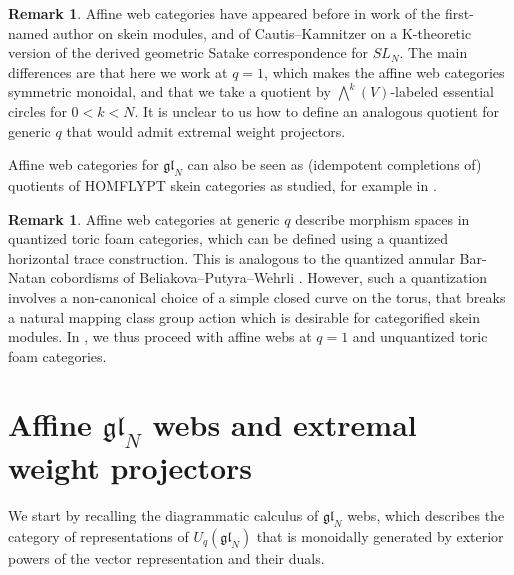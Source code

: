 \documentclass[11pt]{article}
\theoremstyle{definition}
\newtheorem{rema}[theo]{Remark}
\numberwithin{equation}{section}
\newcommand{\glnn}[1]{\mf{gl}_{#1}}
\def\mf{\mathfrak}
\newcommand{\bVn}{\bigwedge}
\begin{document}
\begin{rema} Affine web categories have appeared before in work of the
first-named author \cite{Queff_aff} on skein modules, and of Cautis--Kamnitzer
\cite{CK_ann} on a K-theoretic version of the derived geometric Satake
correspondence for $SL_N$. The main differences are that here we work at $q=1$,
which makes the affine web categories symmetric monoidal, and that we take a
quotient by $\bVn^k(V)$-labeled essential circles for $0<k<N$. It is unclear to
us how to define an analogous quotient for generic $q$ that would admit extremal
weight projectors.

Affine web categories for $\glnn{N}$ can also be seen as (idempotent completions
of) quotients of HOMFLYPT skein categories as studied, for example in
\cite[Section 4]{Bru}.
\end{rema}
\begin{rema}
\label{rem:q}
Affine web categories at generic $q$ describe morphism spaces in quantized toric
foam categories, which can be defined using a quantized horizontal trace
construction. This is analogous to the quantized annular Bar-Natan cobordisms of
Beliakova--Putyra--Wehrli \cite{BPW}. However, such a quantization involves a
non-canonical choice of a simple closed curve on the torus, that breaks a
natural mapping class group action which is desirable for categorified skein
modules. In \cite{QW3}, we thus proceed with affine webs at $q=1$ and
unquantized toric foam categories.
\end{rema}





\section{Affine \texorpdfstring{$\glnn{N}$}{gl(N)} webs and extremal weight projectors}
We start by recalling the diagrammatic calculus of $\glnn{N}$ webs, which describes the category of representations of $U_q(\glnn{N})$ that is monoidally generated by exterior powers of the vector representation and their duals. 
\end{document}
